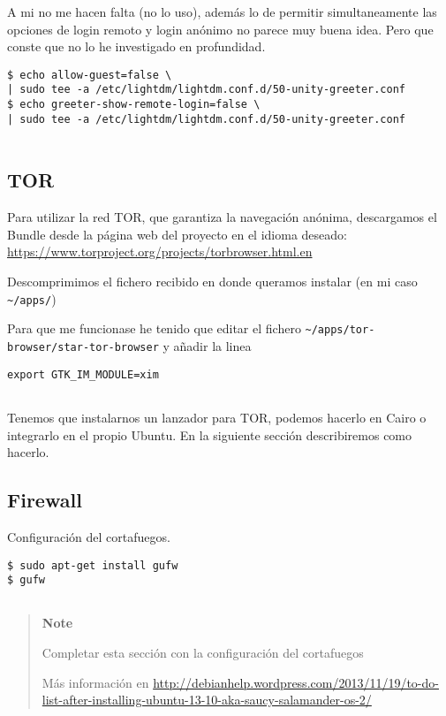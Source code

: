 A mi no me hacen falta (no lo uso), además lo de permitir
simultaneamente las opciones de login remoto y login anónimo no parece
muy buena idea. Pero que conste que no lo he investigado en profundidad.

\begin{verbatim}
$ echo allow-guest=false \
| sudo tee -a /etc/lightdm/lightdm.conf.d/50-unity-greeter.conf
$ echo greeter-show-remote-login=false \
| sudo tee -a /etc/lightdm/lightdm.conf.d/50-unity-greeter.conf
      
\end{verbatim}

\subsection{TOR}\label{tor}

Para utilizar la red TOR, que garantiza la navegación anónima,
descargamos el Bundle desde la página web del proyecto en el idioma
deseado: \url{https://www.torproject.org/projects/torbrowser.html.en}

Descomprimimos el fichero recibido en donde queramos instalar (en mi
caso \texttt{\textasciitilde{}/apps/})

Para que me funcionase he tenido que editar el fichero
\texttt{\textasciitilde{}/apps/tor-browser/star-tor-browser} y añadir la
linea

\begin{verbatim}
export GTK_IM_MODULE=xim
      
\end{verbatim}

Tenemos que instalarnos un lanzador para TOR, podemos hacerlo en Cairo o
integrarlo en el propio Ubuntu. En la siguiente sección describiremos
como hacerlo.

\subsection{Firewall}\label{firewall}

Configuración del cortafuegos.

\begin{verbatim}
$ sudo apt-get install gufw
$ gufw
      
\end{verbatim}

\begin{quote}
\textbf{Note}

Completar esta sección con la configuración del cortafuegos

Más información en
\url{http://debianhelp.wordpress.com/2013/11/19/to-do-list-after-installing-ubuntu-13-10-aka-saucy-salamander-os-2/}
\end{quote}

